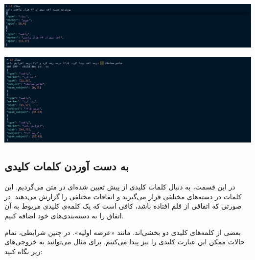 \documentclass[a4paper,12pt]{article}
\begin{document}
\begin{center}
	\includegraphics[scale=0.5, trim ={0 0 17cm 0}, clip]{images/14.png}

	\includegraphics[scale=0.5, trim ={0 0 17cm 0}, clip]{images/15.png}
\end{center}







\subsection*{به دست آوردن کلمات کلیدی}

در این قسمت، به دنبال کلمات کلیدی از پیش تعیین شده‌ای در متن می‌گردیم. این کلمات در 
دسته‌های مختلفی قرار می‌گیرند و اتفاقات مختلفی را گزارش می‌دهند. در صورتی که اتفاقی از 
قلم افتاده باشد، کافی است که یک کلمه‌ی کلیدی مربوط به آن اتفاق را به دسته‌بندی‌های خود 
اضافه کنیم. 

بعضی از کلمه‌های کلیدی دو بخشی‌اند. مانند «عرضه اولیه». در چنین شرایطی، تمام حالات ممکن این 
عبارت کلیدی را نیز پیدا می‌کنیم. برای مثال می‌توانید به خروجی‌های زیر نگاه کنید: 
\end{document}
